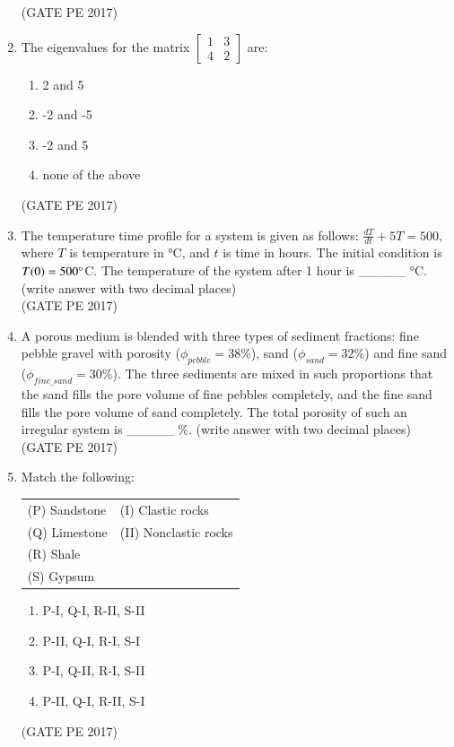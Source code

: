 \documentclass[journal,12pt,onecolumn]{IEEEtran}
\theoremstyle{remark}
\begin{document}
\begin{enumerate}[start=1, label={Q\arabic*.}]
\hfill{(GATE PE 2017)}

\item The eigenvalues for the matrix $ \begin{bmatrix}1 & 3 \\4 & 2 \end{bmatrix}$ are:
\begin{enumerate}
\item 2 and 5
\item -2 and -5
\item -2 and 5
\item none of the above
\end{enumerate}
\hfill{(GATE PE 2017)}

\item The temperature time profile for a system is given as follows:
$ \frac{dT}{dt} + 5T = 500,$ where $T$ is temperature in °C, and $t$ is time in hours. The initial condition is $T(0) = 500\degree$C.
The temperature of the system after 1 hour is \_\_\_\_\_ °C. (write answer with two decimal places)\\

\hfill{(GATE PE 2017)}

\item A porous medium is blended with three types of sediment fractions: fine pebble gravel with porosity ($\phi_{pebble} = 38\%$), sand ($\phi_{sand} = 32\%$) and fine sand ($\phi_{fine\_sand} = 30\%$). The three sediments are mixed in such proportions that the sand fills the pore volume of fine pebbles completely, and the fine sand fills the pore volume of sand completely.
The total porosity of such an irregular system is \_\_\_\_\_ \%. (write answer with two decimal places)\\

\hfill{(GATE PE 2017)}

\item Match the following:\\
\begin{tabular}{ll}
(P) Sandstone & (I) Clastic rocks \\
(Q) Limestone & (II) Nonclastic rocks \\
(R) Shale & \\
(S) Gypsum & \\
\end{tabular}
\begin{enumerate}
\item P-I, Q-I, R-II, S-II \\
\item P-II, Q-I, R-I, S-I \\
\item P-I, Q-II, R-I, S-II \\
\item P-II, Q-I, R-II, S-I
\end{enumerate}
\hfill{(GATE PE 2017)}


\end{enumerate}
\end{document}
